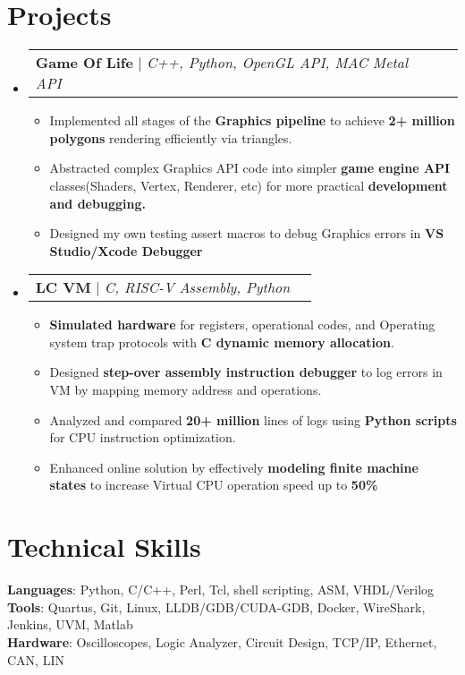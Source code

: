 \documentclass[letterpaper,11pt]{article}
\makeatletter
\newcommand{\resumeItem}[1]{
  \item\small{
    {#1 \vspace{-2pt}}
  }
}
\newcommand{\resumeProjectHeading}[2]{
    \item
    \begin{tabular*}{0.97\textwidth}{l@{\extracolsep{\fill}}r}
      \small#1 & #2 \\
    \end{tabular*}\vspace{-7pt}
}
\newcommand{\resumeSubHeadingListStart}{\begin{itemize}[leftmargin=0.15in, label={}]}
\newcommand{\resumeSubHeadingListEnd}{\end{itemize}}
\newcommand{\resumeItemListStart}{\begin{itemize}}
\newcommand{\resumeItemListEnd}{\end{itemize}\vspace{-5pt}}
\makeatother
\begin{document}
\section{Projects}
    \resumeSubHeadingListStart
      \resumeProjectHeading
      {\textbf{Game Of Life} $|$ \emph{C++, Python, OpenGL API, MAC Metal API }}{}
          \resumeItemListStart
            \resumeItem {Implemented all stages of the \textbf{Graphics pipeline} to achieve \textbf{2+ million polygons} rendering efficiently via triangles.}
            \resumeItem {Abstracted complex Graphics API code into simpler \textbf{game engine API} classes(Shaders, Vertex, Renderer, etc) for more practical \textbf{development and debugging.}}
            \resumeItem {Designed my own testing assert macros to debug Graphics errors in \textbf{VS Studio/Xcode Debugger}}
          \resumeItemListEnd
      \resumeProjectHeading
      {\textbf{LC VM} $|$ \emph{C, RISC-V Assembly, Python}}{}
      \resumeItemListStart
          \resumeItem {\textbf{Simulated hardware} for registers, operational codes, and Operating system trap protocols with \textbf{C dynamic memory allocation}.}
          \resumeItem  { Designed \textbf{step-over assembly instruction debugger} to log errors in VM by mapping memory address and operations.}
          \resumeItem {Analyzed and compared \textbf{20+ million} lines of logs using \textbf{Python scripts} for CPU instruction optimization.}
          \resumeItem {Enhanced online solution by effectively \textbf{modeling finite machine states} to increase Virtual CPU operation speed up to \textbf{50\%}}
      \resumeItemListEnd
    \resumeSubHeadingListEnd
%
\section{Technical Skills}
 \begin{itemize}[leftmargin=0.15in, label={}]
    \small{\item{
     \textbf{Languages}{: Python, C/C++, Perl, Tcl, shell scripting, ASM, VHDL/Verilog} \\
     \textbf{Tools}{: Quartus, Git, Linux, LLDB/GDB/CUDA-GDB, Docker, WireShark, Jenkins, UVM, Matlab } \\
     \textbf{Hardware}{: Oscilloscopes, Logic Analyzer, Circuit Design, TCP/IP, Ethernet, CAN, LIN } \\
    }}
 \end{itemize}


\end{document}
